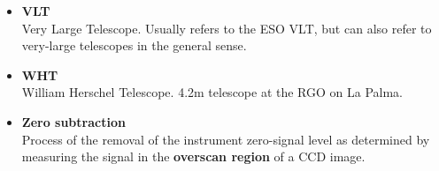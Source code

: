 \documentclass[twoside,11pt]{article}
\newcommand{\htmlref}[2]{#1}
\begin{document}
\begin{itemize}
\item {\bf\label{gl_vlt}VLT}\\
      Very Large Telescope.  Usually refers to the ESO VLT, but can
      also refer to very-large telescopes in the general sense.

\item {\bf\label{gl_wht}WHT}\\
      William Herschel Telescope.  4.2m telescope at the RGO on La Palma.

\item {\bf\label{gl_zero_sub}Zero subtraction}\\
      Process of the removal of the instrument zero-signal level as
      determined by measuring the signal in the
      \htmlref{{\bf overscan region}}{gl_overscan} of a CCD image.


\end{itemize}
\end{document}

